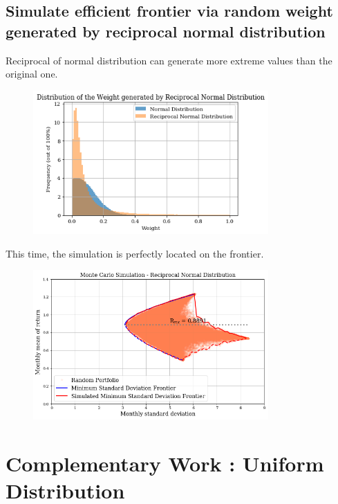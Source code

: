 \documentclass{article}
\begin{document}
\newpage

\subsection{Simulate efficient frontier via random weight generated by reciprocal normal distribution}

Reciprocal of normal distribution can generate more extreme values than the original one.
\begin{figure}[h]
	\centering
	\includegraphics[width=9cm]{output_39_0.png}
\end{figure}

This time, the simulation is perfectly located on the frontier.
\begin{figure}[h]
	\centering
	\includegraphics[width=9cm]{output_43_0.png}
\end{figure}

\section{Complementary Work : Uniform Distribution}
\end{document}
